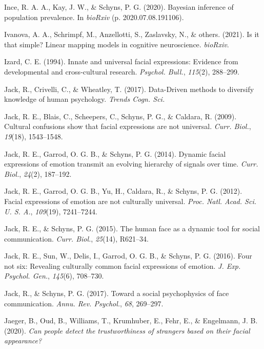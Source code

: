 \documentclass[11pt,american,a4paper,oneside,]{memoir} %
\begin{document}
\leavevmode\hypertarget{ref-Ince2020-mr}{}%
Ince, R. A. A., Kay, J. W., \& Schyns, P. G. (2020). Bayesian inference of population prevalence. In \emph{bioRxiv} (p. 2020.07.08.191106).

\leavevmode\hypertarget{ref-Ivanova2021-wk}{}%
Ivanova, A. A., Schrimpf, M., Anzellotti, S., Zaslavsky, N., \& others. (2021). Is it that simple? Linear mapping models in cognitive neuroscience. \emph{bioRxiv}.

\leavevmode\hypertarget{ref-Izard1994-ca}{}%
Izard, C. E. (1994). Innate and universal facial expressions: Evidence from developmental and cross-cultural research. \emph{Psychol. Bull.}, \emph{115}(2), 288--299.

\leavevmode\hypertarget{ref-Jack2017-qp}{}%
Jack, R., Crivelli, C., \& Wheatley, T. (2017). Data-Driven methods to diversify knowledge of human psychology. \emph{Trends Cogn. Sci.}

\leavevmode\hypertarget{ref-Jack2009-yy}{}%
Jack, R. E., Blais, C., Scheepers, C., Schyns, P. G., \& Caldara, R. (2009). Cultural confusions show that facial expressions are not universal. \emph{Curr. Biol.}, \emph{19}(18), 1543--1548.

\leavevmode\hypertarget{ref-Jack2014-ku}{}%
Jack, R. E., Garrod, O. G. B., \& Schyns, P. G. (2014). Dynamic facial expressions of emotion transmit an evolving hierarchy of signals over time. \emph{Curr. Biol.}, \emph{24}(2), 187--192.

\leavevmode\hypertarget{ref-Jack2012-eq}{}%
Jack, R. E., Garrod, O. G. B., Yu, H., Caldara, R., \& Schyns, P. G. (2012). Facial expressions of emotion are not culturally universal. \emph{Proc. Natl. Acad. Sci. U. S. A.}, \emph{109}(19), 7241--7244.

\leavevmode\hypertarget{ref-Jack2015-sh}{}%
Jack, R. E., \& Schyns, P. G. (2015). The human face as a dynamic tool for social communication. \emph{Curr. Biol.}, \emph{25}(14), R621--34.

\leavevmode\hypertarget{ref-Jack2016-jq}{}%
Jack, R. E., Sun, W., Delis, I., Garrod, O. G. B., \& Schyns, P. G. (2016). Four not six: Revealing culturally common facial expressions of emotion. \emph{J. Exp. Psychol. Gen.}, \emph{145}(6), 708--730.

\leavevmode\hypertarget{ref-Jack2017-gt}{}%
Jack, R., \& Schyns, P. G. (2017). Toward a social psychophysics of face communication. \emph{Annu. Rev. Psychol.}, \emph{68}, 269--297.

\leavevmode\hypertarget{ref-Jaeger2020-sr}{}%
Jaeger, B., Oud, B., Williams, T., Krumhuber, E., Fehr, E., \& Engelmann, J. B. (2020). \emph{Can people detect the trustworthiness of strangers based on their facial appearance?}
\end{document}
